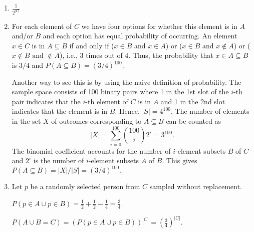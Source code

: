 \begin{enumerate}[label=(\alph*)]

    \item $\frac{1}{2^{|C|}}$

    \item For each element of $C$ we have four options for whether this element is in $A$ and/or $B$ and each option has equal probability of occurring.
          An element $x \in C$ is in $A \subseteq B$ if and only if ($x \in B \text{ and } x \in A$) or ($x \in B \text{ and } x \notin A$) or ($x \notin B \text{ and } \notin A$), i.e., 3 times out of 4.
          Thus, the probability that $x \in A \subseteq B$ is $3/4$ and $P(A \subseteq B) = (3/4)^{100}$.

          Another way to see this is by using the naive definition of probability.
          The sample space consists of 100 binary pairs where 1 in the 1st slot of the $i$-th pair indicates that the $i$-th element of $C$ is in $A$ and 1 in the 2nd slot indicates that the element is in $B$.
          Hence, $|S| = 4^{100}$.
          The number of elements in the set $X$ of outcomes corresponding to $A \subseteq B$ can be counted as
          $$|X| = \sum_{i=0}^{100} \binom{100}{i}2^i = 3^{100}.$$
          The binomial coefficient accounts for the number of $i$-element subsets $B$ of $C$ and $2^i$ is the number of $i$-element subsets $A$ of $B$.
          This gives $P(A \subseteq B) = |X| / |S| = (3/4)^{100}.$

    \item Let $p$ be a randomly selected person from $C$ sampled without
          replacement.

          $P(p \in A \cup p \in B) = \frac{1}{2} + \frac{1}{2} - \frac{1}{4} = \frac{3}
              {4}$.

          $P(A \cup B = C) = (P(p \in A \cup p \in B))^{|C|} = \left(\frac{3}{4}\right)^
              {|C|}.$
\end{enumerate}